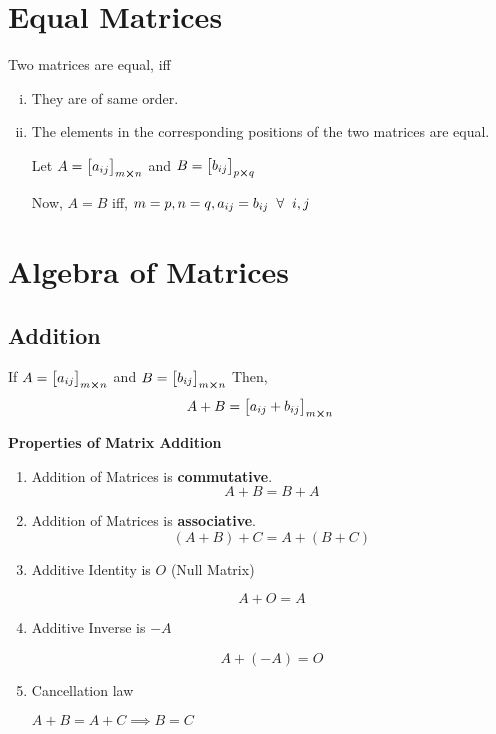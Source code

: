 \documentclass{article}
\begin{document}
\section{Equal Matrices}
Two matrices are equal, iff
\begin{enumerate}[i.]
    \item They are of same order.
    \item The elements in the corresponding positions of the two matrices are equal.

          Let $A={\begin{bmatrix}
                  a_{ij}
              \end{bmatrix}}_{m \cross n} $ and $B={\begin{bmatrix}
                  b_{ij}
              \end{bmatrix}}_{p \cross q} $

          Now, $A=B$ iff, $m=p, n=q, a_{ij}=b_{ij} \hspace{2mm} \forall \hspace{2mm} i,j$
\end{enumerate}

\section{Algebra of Matrices}

\subsection{Addition}
If $A={\begin{bmatrix}
        a_{ij}
    \end{bmatrix}}_{m \cross n} $ and $B={\begin{bmatrix}
        b_{ij}
    \end{bmatrix}}_{m \cross n} $
\newline \newline
Then, $$A+B= {\begin{bmatrix}
        a_{ij}+b_{ij}
    \end{bmatrix}}_{m \cross n} $$

\textbf{Properties of Matrix Addition}

\begin{enumerate}[1.]
    \item Addition of Matrices is \textbf{commutative}.
          $$A+B= B+A$$

    \item Addition of Matrices is \textbf{associative}.
          $$(A+B)+C=A+(B+C)$$

    \item Additive Identity is $O$ (Null Matrix)

          $$A+O=A$$

    \item Additive Inverse is $-A$

          $$A+ (-A)= O$$

    \item Cancellation law

          $A+B=A+C \implies B=C$
\end{enumerate}
\end{document}
